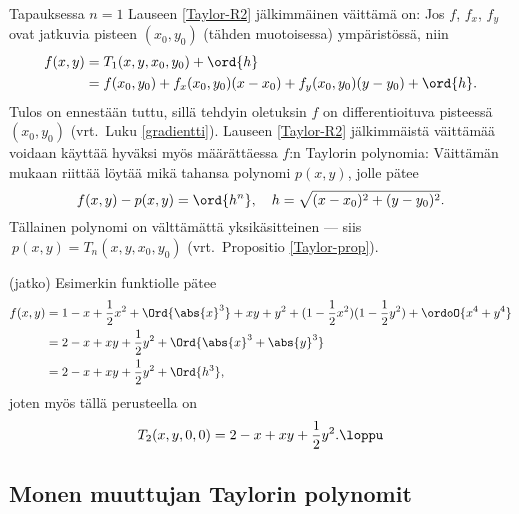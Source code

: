 Tapauksessa $n=1$ Lauseen \ref{Taylor-R2} jälkimmäinen väittämä on: Jos $f$, $f_x$,
$f_y$ ovat jatkuvia pisteen $(x_0,y_0)$ (tähden muotoisessa) ympäristössä, niin
\begin{align*}
f(x,y) &= T_1(x,y,x_0,y_0)+\ord{h} \\
&= f(x_0,y_0)+f_x(x_0,y_0)(x-x_0)+f_y(x_0,y_0)(y-y_0)+\ord{h}.
\end{align*}
Tulos on ennestään tuttu, sillä tehdyin oletuksin $f$ on differentioituva pisteessä $(x_0,y_0)$
(vrt.\ Luku \ref{gradientti}). Lauseen \ref{Taylor-R2} jälkimmäistä väittämää voidaan käyttää
hyväksi myös määrättäessa $f$:n Taylorin polynomia: Väittämän mukaan riittää löytää mikä
tahansa polynomi $p(x,y)$, jolle pätee
\[
f(x,y)-p(x,y)=\ord{h^{n}},\quad h=\sqrt{(x-x_0)^2+(y-y_0)^2}.
\]
Tällainen polynomi on välttämättä yksikäsitteinen --- siis $\ p(x,y)=T_n(x,y,x_0,y_0)$
(vrt.\ Propositio \ref{Taylor-prop}).
\jatko \begin{Exa} (jatko) Esimerkin funktiolle pätee
\begin{align*}
f(x,y)&=1-x+\frac{1}{2}x^2+\Ord{\abs{x}^3}+xy+y^2
                          +(1-\frac{1}{2}x^2)(1-\frac{1}{2}y^2)+\ordoO{x^4+y^4} \\
&= 2-x+xy+\frac{1}{2}y^2+\Ord{\abs{x}^3+\abs{y}^3} \\
&= 2-x+xy+\frac{1}{2}y^2+\Ord{h^3},
\end{align*}
joten myös tällä perusteella on
\[
T_2(x,y,0,0)=2-x+xy+\frac{1}{2}y^2. \loppu
\]
\end{Exa}

\subsection*{Monen muuttujan Taylorin polynomit}


